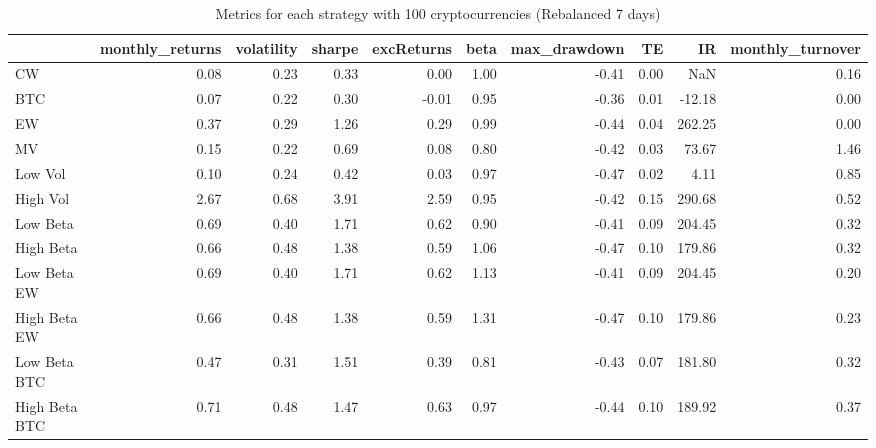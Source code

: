 \begin{table}
\centering
\caption{Metrics for each strategy with 100 cryptocurrencies (Rebalanced 7 days)}
\label{metrics100_7}
\begin{tabular}{lrrrrrrrrr}
\toprule
{} &  monthly\_returns &  volatility &  sharpe &  excReturns &  beta &  max\_drawdown &   TE &     IR &  monthly\_turnover \\
\midrule
CW            &             0.08 &        0.23 &    0.33 &        0.00 &  1.00 &         -0.41 & 0.00 &    NaN &              0.16 \\
BTC           &             0.07 &        0.22 &    0.30 &       -0.01 &  0.95 &         -0.36 & 0.01 & -12.18 &              0.00 \\
EW            &             0.37 &        0.29 &    1.26 &        0.29 &  0.99 &         -0.44 & 0.04 & 262.25 &              0.00 \\
MV            &             0.15 &        0.22 &    0.69 &        0.08 &  0.80 &         -0.42 & 0.03 &  73.67 &              1.46 \\
Low Vol       &             0.10 &        0.24 &    0.42 &        0.03 &  0.97 &         -0.47 & 0.02 &   4.11 &              0.85 \\
High Vol      &             2.67 &        0.68 &    3.91 &        2.59 &  0.95 &         -0.42 & 0.15 & 290.68 &              0.52 \\
Low Beta      &             0.69 &        0.40 &    1.71 &        0.62 &  0.90 &         -0.41 & 0.09 & 204.45 &              0.32 \\
High Beta     &             0.66 &        0.48 &    1.38 &        0.59 &  1.06 &         -0.47 & 0.10 & 179.86 &              0.32 \\
Low Beta EW   &             0.69 &        0.40 &    1.71 &        0.62 &  1.13 &         -0.41 & 0.09 & 204.45 &              0.20 \\
High Beta EW  &             0.66 &        0.48 &    1.38 &        0.59 &  1.31 &         -0.47 & 0.10 & 179.86 &              0.23 \\
Low Beta BTC  &             0.47 &        0.31 &    1.51 &        0.39 &  0.81 &         -0.43 & 0.07 & 181.80 &              0.32 \\
High Beta BTC &             0.71 &        0.48 &    1.47 &        0.63 &  0.97 &         -0.44 & 0.10 & 189.92 &              0.37 \\
\bottomrule
\end{tabular}
\end{table}
